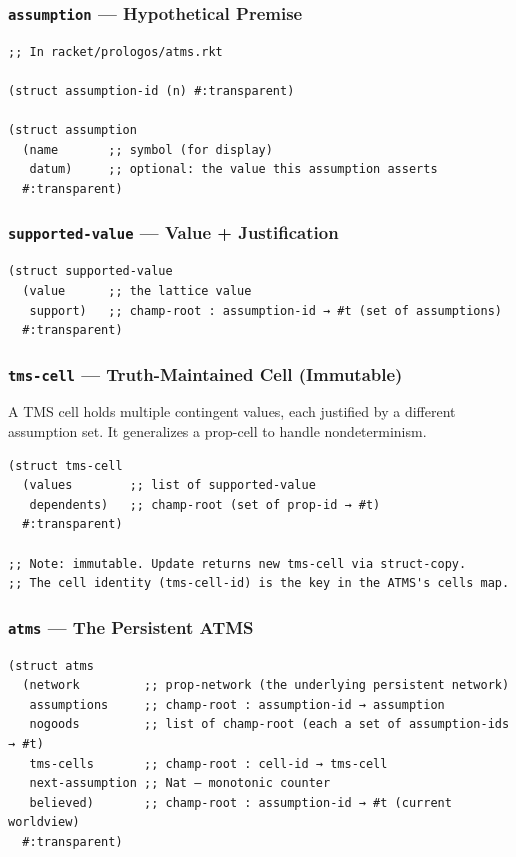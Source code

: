 \documentclass[11pt]{article}
\begin{document}
\subsubsection{\texttt{assumption} — Hypothetical Premise}
\label{sec:orgfbddc26}

\begin{verbatim}
;; In racket/prologos/atms.rkt

(struct assumption-id (n) #:transparent)

(struct assumption
  (name       ;; symbol (for display)
   datum)     ;; optional: the value this assumption asserts
  #:transparent)
\end{verbatim}
\subsubsection{\texttt{supported-value} — Value + Justification}
\label{sec:org7fa9bbc}

\begin{verbatim}
(struct supported-value
  (value      ;; the lattice value
   support)   ;; champ-root : assumption-id → #t (set of assumptions)
  #:transparent)
\end{verbatim}
\subsubsection{\texttt{tms-cell} — Truth-Maintained Cell (Immutable)}
\label{sec:orgbbf78d8}

A TMS cell holds multiple contingent values, each justified by a different
assumption set. It generalizes a prop-cell to handle nondeterminism.

\begin{verbatim}
(struct tms-cell
  (values        ;; list of supported-value
   dependents)   ;; champ-root (set of prop-id → #t)
  #:transparent)

;; Note: immutable. Update returns new tms-cell via struct-copy.
;; The cell identity (tms-cell-id) is the key in the ATMS's cells map.
\end{verbatim}
\subsubsection{\texttt{atms} — The Persistent ATMS}
\label{sec:orgebfc08e}

\begin{verbatim}
(struct atms
  (network         ;; prop-network (the underlying persistent network)
   assumptions     ;; champ-root : assumption-id → assumption
   nogoods         ;; list of champ-root (each a set of assumption-ids → #t)
   tms-cells       ;; champ-root : cell-id → tms-cell
   next-assumption ;; Nat — monotonic counter
   believed)       ;; champ-root : assumption-id → #t (current worldview)
  #:transparent)
\end{verbatim}
\end{document}
